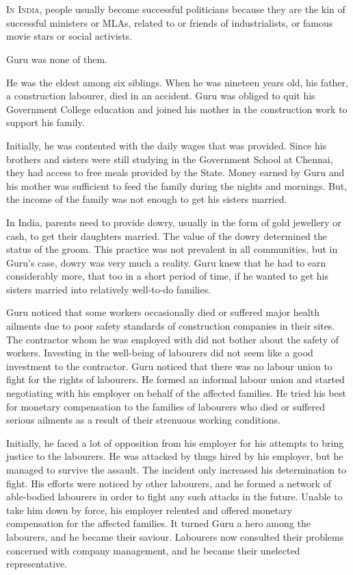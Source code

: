 \chapter{}

\lettrine{I}{n India}, people usually become successful politicians because they are the kin
of successful ministers or MLAs, related to or friends of industrialists, or famous
movie stars or social activists.

Guru was none of them.

He was the eldest among six siblings. When he was nineteen years old, his
father, a construction labourer, died in an accident. Guru was obliged to quit
his Government College education and joined his mother in the construction work
to support his family.

Initially, he was contented with the daily wages that was provided. Since his
brothers and sisters were still studying in the Government School at Chennai,
they had access to free meals provided by the State. Money earned by Guru and
his mother was sufficient to feed the family during the nights and mornings.
But, the income of the family was not enough to get his sisters married.

In India, parents need to provide dowry, usually in the form of gold jewellery
or cash, to get their
daughters married. The value of the dowry determined the status of the groom.
This practice was not prevalent in all communities, but in Guru's case, dowry
was very much a reality. Guru knew that he had to earn considerably more, that
too in a short period of time, if he wanted to get his sisters married into
relatively well-to-do families.

Guru noticed that some workers occasionally died or suffered major health
ailments due to poor safety standards of construction companies in their sites. The
contractor whom he was employed with did not bother about the safety of workers.
Investing in the well-being of labourers did not seem like a good investment to
the contractor. Guru noticed that there was no labour union to fight for the
rights of labourers. He formed an informal labour union and started negotiating
with his employer on behalf of the affected families. He tried his best for
monetary compensation to the families of labourers who died or suffered serious
ailments as a result of their strenuous working conditions.

Initially, he faced a lot of opposition from his employer for his attempts to
bring justice to the labourers. He was attacked by thugs hired by his employer,
but he managed to survive the assault. The incident only increased his
determination to fight. His efforts were noticed by other labourers, and he formed
a network of able-bodied labourers in order to fight any such attacks in the
future. Unable to take him down by force, his employer relented and offered
monetary compensation for the affected families. It turned Guru a hero among the
labourers, and he became their saviour. Labourers now consulted their problems
concerned with company management, and he became their unelected representative.

